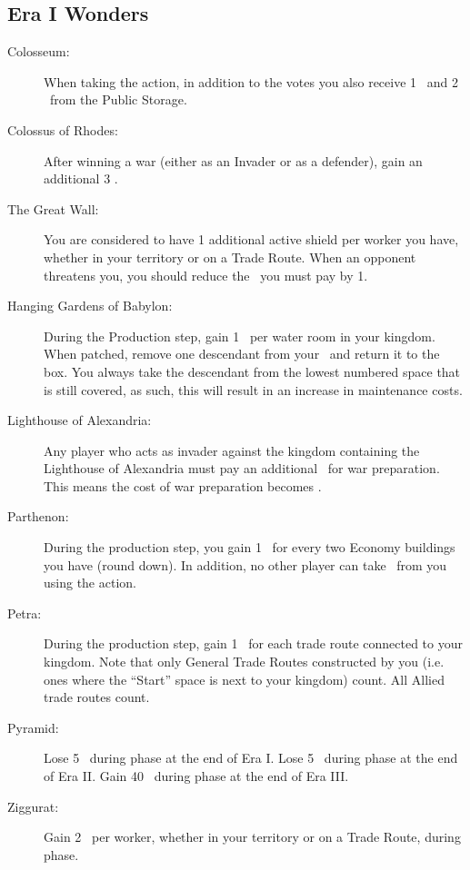 \documentclass[10pt,twocolumn]{article}
\begin{document}
\begin{appendices}
\subsection{Era I Wonders}
\begin{description}
\item[Colosseum:] When taking the  action, in addition to the votes you also receive 1 \vp\ and 2 \money\ from the Public Storage.
\item[Colossus of Rhodes:] After winning a war (either as an Invader or as a defender), gain an additional 3 \vps.
\item[The Great Wall:] You are considered to have 1 additional active shield per worker you have, whether in your territory or on a Trade Route. When an opponent threatens you, you should reduce the \goods\ you must pay by 1.
\item[Hanging Gardens of Babylon:] During the Production step, gain 1 \vp\ per water room in your kingdom. When patched, remove one descendant from your \psb\ and return it to the box. You always take the descendant from the lowest numbered space that is still covered, as such, this will result in an increase in maintenance costs.
\item[Lighthouse of Alexandria:] Any player who acts as invader against the kingdom containing the Lighthouse of Alexandria must pay an additional \mineral\ for war preparation. This means the cost of war preparation becomes .
\item[Parthenon:] During the production step, you gain 1 \vp\ for every two Economy buildings you have (round down). In addition, no other player can take \money\ from you using the  action.
\item[Petra:] During the production step, gain 1 \money\ for each trade route connected to your kingdom. Note that only General Trade Routes constructed by you (i.e. ones where the ``Start'' space is next to your kingdom) count. All Allied trade routes count.
\item[Pyramid:] Lose 5 \vps\ during  phase at the end of Era I. Lose 5 \vps\ during  phase at the end of Era II. Gain 40 \vps\ during  phase at the end of Era III.
\item[Ziggurat:] Gain 2 \vps\ per worker, whether in your territory or on a Trade Route, during  phase.
\end{description}

\end{appendices}
\end{document}
